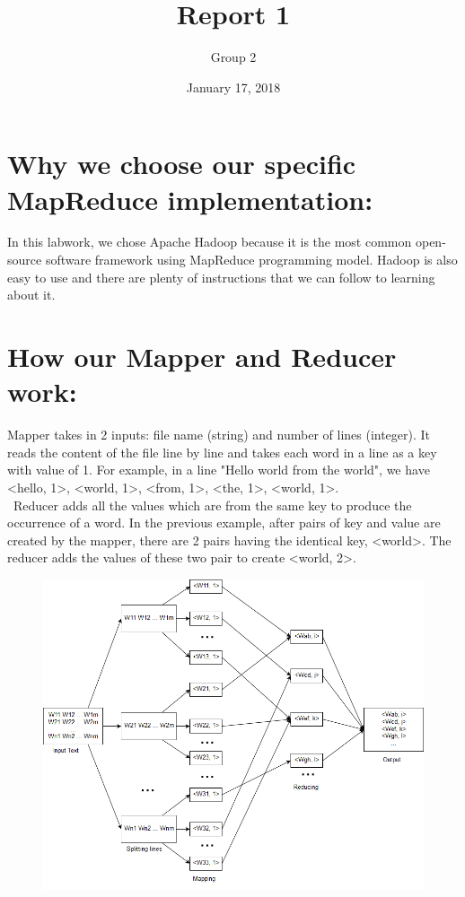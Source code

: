 \documentclass[12pt]{article}
\title{Report 1}
\author{Group 2}
\date{January 17, 2018}
\begin{document}
\maketitle
  \section{Why we choose our specific MapReduce implementation:}
    In this labwork, we chose Apache Hadoop because it is the most common open-source software framework using MapReduce programming model. Hadoop is also easy to use and there are plenty of instructions that we can follow to learning about it. 
  
  \section{How our Mapper and Reducer work:}
    Mapper takes in 2 inputs: file name (string) and number of lines (integer). It reads the content of the file line by line and takes each word in a line as a key with value of 1. For example, in a line "Hello world from the world", we have <hello, 1>, <world, 1>, <from, 1>, <the, 1>, <world, 1>. \\\
    Reducer adds all the values which are from the same key to produce the occurrence of a word. In the previous example, after pairs of key and value are created by the mapper, there are 2 pairs having the identical key, <world>. The reducer adds the values of these two pair to create <world, 2>.
    \begin{figure}[h]
      \centering
      \includegraphics{WordCounter.png}
    \end{figure}
\end{document}
